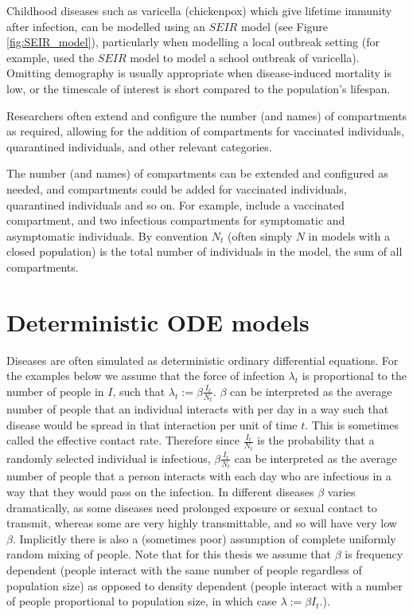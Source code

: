 Childhood diseases such as varicella (chickenpox) which give lifetime immunity
after infection, can be modelled using an $SEIR$ model (see Figure
\ref{fig:SEIR_model}), particularly when modelling a local outbreak setting
(for example, \cite{zha_research_2020} used the $SEIR$ model to model a school
outbreak of varicella). Omitting demography is usually appropriate when 
disease-induced mortality is low, or the timescale of interest is short 
compared to the population's lifespan.

Researchers often extend and configure the number (and names) of compartments 
as required, allowing for the addition of compartments for 
vaccinated individuals, quarantined individuals, and other relevant categories.

The number (and names) of compartments can be extended and configured as
needed, and compartments could be added for vaccinated individuals, quarantined
individuals and so on. For example,  
include a vaccinated compartment, and two infectious compartments for 
symptomatic and asymptomatic individuals.
By convention $N_t$ (often simply $N$ in models with a
closed population) is the total number of individuals in the model, the sum of
all compartments.

\section{Deterministic ODE models}

Diseases are often simulated as deterministic ordinary differential equations.
For the examples below we assume that the force of infection $\lambda_t$ is
proportional to the number of people in $I$, such that
$\lambda_t := \beta \frac{I_t}{N_t}.$ $\beta$ can be interpreted as the average
number of people that an individual interacts with per day in a way such that
disease would be spread in that interaction per unit of time $t$. This is
sometimes called the effective contact rate. Therefore since $\frac{I_t}{N_t}$
is the probability that a randomly selected individual is infectious,
$\beta \frac{I_t}{N_t}$ can be interpreted as the average number of people that
a person interacts with each day who are infectious in a way that they would
pass on the infection. In different diseases $\beta$ varies dramatically, as
some diseases need prolonged exposure or sexual contact to transmit, whereas
some are very highly transmittable, and so will have very low $\beta.$
Implicitly there is also a (sometimes poor) assumption of complete uniformly
random mixing of people. Note that for this thesis we assume that $\beta$ is
frequency dependent (people interact with the same number of people regardless
of population size) as opposed to density dependent (people interact with a
number of people proportional to population size, in which case
$\lambda := \beta I_t.$).

